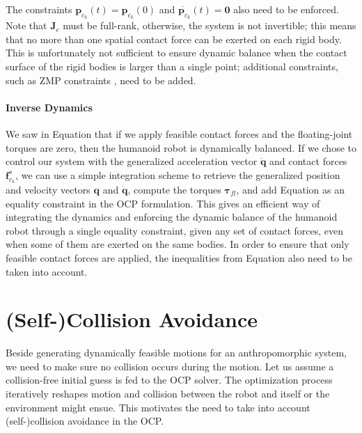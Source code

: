 The constraints $\mathbf{p}_{c_k}(t)=\mathbf{p}_{c_k}(0)$ and
$\dot{\mathbf{p}_{c_k}}(t)=\mathbf{0}$ also need to be enforced. Note
that $\mathbf{J}_{c}$ must be full-rank, otherwise, the system is not
invertible; this means that no more than one spatial contact force can
be exerted on each rigid body. This is unfortunately not sufficient to
ensure dynamic balance when the contact surface of the rigid bodies is
larger than a single point; additional constraints, such as ZMP
constraints \cite{koch2012optimization}, need to be added.

\paragraph{Inverse Dynamics}

We saw in Equation  that if we
apply feasible contact forces and the floating-joint torques are zero,
then the humanoid robot is dynamically balanced. If we chose to
control our system with the generalized acceleration vector
$\mathbf{\ddot{q}}$ and contact forces $\mathbf{f}^s_{c_k}$, we can use
a simple integration scheme to retrieve the generalized position and
velocity vectors $\mathbf{q}$ and $\mathbf{\dot{q}}$, compute the
torques $\boldsymbol{\tau}_{fl}$, and add Equation
 as an equality constraint in
the OCP formulation. This gives an efficient way of integrating the
dynamics and enforcing the dynamic balance of the humanoid robot
through a single equality constraint, given any set of contact forces,
even when some of them are exerted on the same bodies. In order to
ensure that only feasible contact forces are applied, the inequalities
from Equation  also need to be taken into
account.

\section{(Self-)Collision Avoidance}
\label{sec:chap3-collision-avoidance}

Beside generating dynamically feasible motions for an anthropomorphic
system, we need to make sure no collision occurs during the
motion. Let us assume a collision-free initial guess is fed to the OCP
solver. The optimization process iteratively reshapes motion and
collision between the robot and itself or the environment might
ensue. This motivates the need to take into account (self-)collision
avoidance in the OCP.

